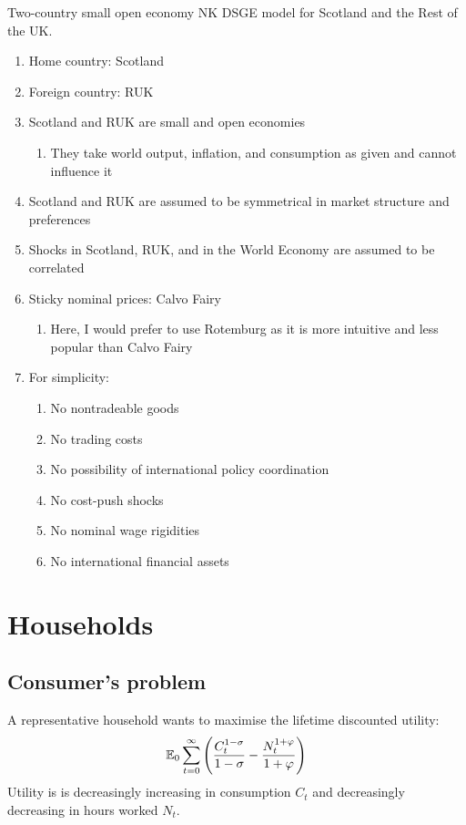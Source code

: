 \documentclass[12pt]{article}
\begin{document}
Two-country small open economy NK DSGE model for Scotland and the Rest of the UK.

\begin{enumerate}


    \item Home country: Scotland
    \item  Foreign country: RUK
    \item  Scotland and RUK are small and open economies
          \begin{enumerate}
              \item They take world output, inflation, and consumption as given and cannot influence it
          \end{enumerate}
    \item Scotland and RUK are assumed to be symmetrical in market structure and preferences
    \item Shocks in Scotland, RUK, and in the World Economy are assumed to be correlated
    \item Sticky nominal prices: Calvo Fairy
          \begin{enumerate}
              \item Here, I would prefer to use Rotemburg as it is more intuitive and less popular than Calvo Fairy
          \end{enumerate}
    \item For simplicity:
          \begin{enumerate}
              \item No nontradeable goods
              \item No trading costs
              \item No possibility of international policy coordination
              \item No cost-push shocks
              \item No nominal wage rigidities
              \item No international financial assets
          \end{enumerate}

\end{enumerate}

\pagebreak

\section{Households}
\subsection*{Consumer's problem}
A representative household wants to maximise the lifetime discounted utility:
\begin{equation}
    \operatorname{\mathbb{E}}_0 \sum^{\infty}_{t=0} \left( \frac{C_t^{1-\sigma}}{1-\sigma} - \frac{N_t^{1+\varphi}}{1+\varphi} \right)
\end{equation}
Utility is is decreasingly increasing in consumption $C_t$ and decreasingly decreasing in hours worked $N_t$.
\end{document}
